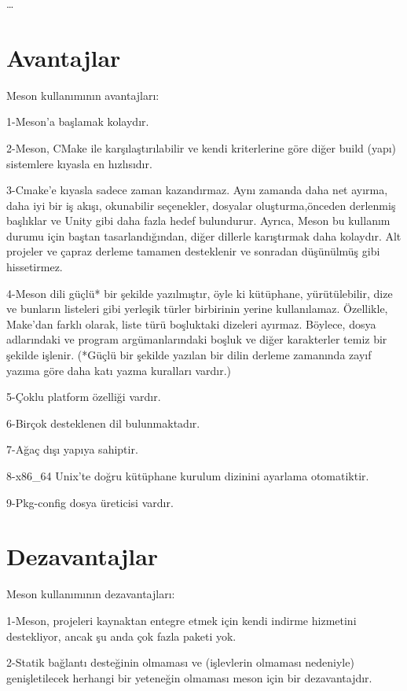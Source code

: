 \documentclass[
]{book}
\begin{document}
\ldots{}

\hypertarget{avantajlar-4}{%
\section*{Avantajlar}\label{avantajlar-4}}

Meson kullanımının avantajları:

1-Meson'a başlamak kolaydır.

2-Meson, CMake ile karşılaştırılabilir ve kendi kriterlerine göre diğer build (yapı) sistemlere kıyasla en hızlısıdır.

3-Cmake'e kıyasla sadece zaman kazandırmaz. Aynı zamanda daha net ayırma, daha iyi bir iş akışı, okunabilir seçenekler, dosyalar oluşturma,önceden derlenmiş başlıklar ve Unity gibi daha fazla hedef bulundurur.
Ayrıca, Meson bu kullanım durumu için baştan tasarlandığından, diğer dillerle karıştırmak daha kolaydır. Alt projeler ve çapraz derleme tamamen desteklenir ve sonradan düşünülmüş gibi hissetirmez.

4-Meson dili güçlü* bir şekilde yazılmıştır, öyle ki kütüphane, yürütülebilir, dize ve bunların listeleri gibi yerleşik türler birbirinin yerine kullanılamaz. Özellikle, Make'dan farklı olarak, liste türü boşluktaki dizeleri ayırmaz. Böylece, dosya adlarındaki ve program argümanlarındaki boşluk ve diğer karakterler temiz bir şekilde işlenir.
(*Güçlü bir şekilde yazılan bir dilin derleme zamanında zayıf yazıma göre daha katı yazma kuralları vardır.)

5-Çoklu platform özelliği vardır.

6-Birçok desteklenen dil bulunmaktadır.

7-Ağaç dışı yapıya sahiptir.

8-x86\_64 Unix'te doğru kütüphane kurulum dizinini ayarlama otomatiktir.

9-Pkg-config dosya üreticisi vardır.

\hypertarget{dezavantajlar-4}{%
\section*{Dezavantajlar}\label{dezavantajlar-4}}

Meson kullanımının dezavantajları:

1-Meson, projeleri kaynaktan entegre etmek için kendi indirme hizmetini destekliyor, ancak şu anda çok fazla paketi yok.

2-Statik bağlantı desteğinin olmaması ve (işlevlerin olmaması nedeniyle) genişletilecek herhangi bir yeteneğin olmaması meson için bir dezavantajdır.
\end{document}
